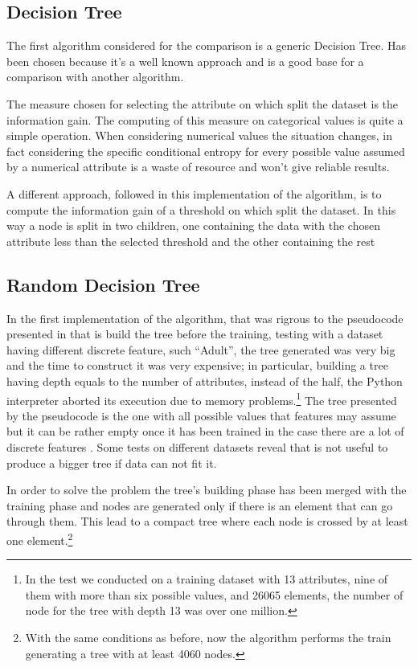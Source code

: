 \documentclass{acm_proc_article-sp-sigmod07}
\begin{document}
\subsection{Decision Tree}
The first algorithm considered for the comparison is a generic Decision
Tree. Has been chosen because it's a well known approach and is a good
base for a comparison with another algorithm.

The measure chosen for selecting the attribute on which split the dataset
is the information gain.
The computing of this measure on categorical values is quite a simple
operation. When considering numerical values the situation changes, in
fact considering the specific conditional entropy for every possible value
assumed by a numerical attribute is a waste of resource and won't give
reliable results.

A different approach, followed in this implementation of the algorithm, is
to compute the information gain of a threshold on which split the dataset.
In this way a node is split in two children, one containing the data with
the chosen attribute less than the selected threshold and the other
containing the rest 

\subsection{Random Decision Tree}
In the first implementation of the algorithm, that was rigrous to the
pseudocode presented in \cite{fan:rdt} that is build the tree before the
training, testing with a dataset having different discrete feature, such
``Adult'', the tree generated was very big and the time to construct it was
very expensive; in particular, building a tree having depth equals to the
number of attributes, instead of the half, the Python interpreter
aborted its execution due to memory problems.\footnote{In the test we
conducted on a training dataset with 13 attributes, nine of them with
more than six possible values, and 26065 elements, the number of node for
the tree with depth 13 was over one million.}
The tree presented by the pseudocode is the one with all possible values
that features may assume but it can be rather empty once it has been
trained in the case there are a lot of discrete features . Some tests
on different datasets reveal that is not useful to produce a bigger tree if
data can not fit it.

In order to solve the problem the tree's building phase has been merged
with the training phase and nodes are generated only if there is an element
that can go through them. This lead to a compact tree where
each node is crossed by at least one element.\footnote{With the same
conditions as before, now the algorithm performs the train generating a
tree with at least 4060 nodes.}
\end{document}
